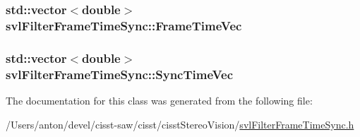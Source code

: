 \subsubsection[{Frame\+Time\+Vec}]{\setlength{\rightskip}{0pt plus 5cm}std\+::vector$<$double$>$ svl\+Filter\+Frame\+Time\+Sync\+::\+Frame\+Time\+Vec\hspace{0.3cm}{\ttfamily [protected]}}\label{classsvl_filter_frame_time_sync_a7bf99c445800fe0e23a70eba6bd93f3d}
\hypertarget{classsvl_filter_frame_time_sync_a4d5d8201aa1a99de2559bc304ad54678}{}
\subsubsection[{Sync\+Time\+Vec}]{\setlength{\rightskip}{0pt plus 5cm}std\+::vector$<$double$>$ svl\+Filter\+Frame\+Time\+Sync\+::\+Sync\+Time\+Vec\hspace{0.3cm}{\ttfamily [protected]}}\label{classsvl_filter_frame_time_sync_a4d5d8201aa1a99de2559bc304ad54678}


The documentation for this class was generated from the following file\+:\begin{DoxyCompactItemize}
\item 
/\+Users/anton/devel/cisst-\/saw/cisst/cisst\+Stereo\+Vision/\hyperlink{svl_filter_frame_time_sync_8h}{svl\+Filter\+Frame\+Time\+Sync.\+h}\end{DoxyCompactItemize}

